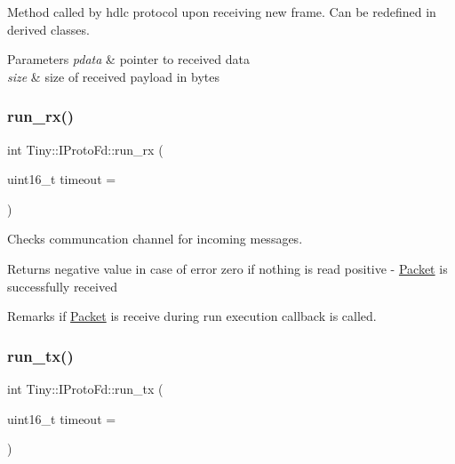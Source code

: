 Method called by hdlc protocol upon receiving new frame. Can be redefined in derived classes. 
\begin{DoxyParams}{Parameters}
{\em pdata} & pointer to received data \\
\hline
{\em size} & size of received payload in bytes \\
\hline
\end{DoxyParams}
\mbox{\label{classTiny_1_1IProtoFd_a37292eb5c9faf1be8c4850985e0ae2eb}} 
\subsubsection{\texorpdfstring{run\+\_\+rx()}{run\_rx()}}
{\footnotesize\ttfamily int Tiny\+::\+I\+Proto\+Fd\+::run\+\_\+rx (\begin{DoxyParamCaption}\item[{uint16\+\_\+t}]{timeout = {} }\end{DoxyParamCaption})}

Checks communcation channel for incoming messages. \begin{DoxyReturn}{Returns}
negative value in case of error zero if nothing is read positive -\/ \hyperlink{classTiny_1_1Packet}{Packet} is successfully received 
\end{DoxyReturn}
\begin{DoxyRemark}{Remarks}
if \hyperlink{classTiny_1_1Packet}{Packet} is receive during run execution callback is called. 
\end{DoxyRemark}
\mbox{\label{classTiny_1_1IProtoFd_a19be0bd5124009c7de051554841070b3}} 
\subsubsection{\texorpdfstring{run\+\_\+tx()}{run\_tx()}}
{\footnotesize\ttfamily int Tiny\+::\+I\+Proto\+Fd\+::run\+\_\+tx (\begin{DoxyParamCaption}\item[{uint16\+\_\+t}]{timeout = {} }\end{DoxyParamCaption})}

